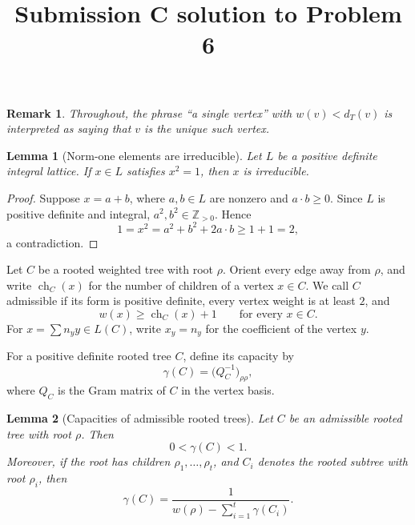 \documentclass[11pt]{article}
\newtheorem{lemma}{Lemma}
\newtheorem{remark}{Remark}
\DeclareMathOperator{\ch}{ch}
\begin{document}
\title{Submission C solution to Problem 6}
\date{}
\maketitle


\begin{remark}
Throughout, the phrase ``a single vertex'' with \(w(v)<d_T(v)\) is interpreted as saying that \(v\) is the unique such vertex.
\end{remark}

\begin{lemma}[Norm-one elements are irreducible]
Let \(L\) be a positive definite integral lattice. If \(x\in L\) satisfies \(x^2=1\), then \(x\) is irreducible.
\end{lemma}

\begin{proof}
Suppose \(x=a+b\), where \(a,b\in L\) are nonzero and \(a\cdot b\ge 0\). Since \(L\) is positive definite and integral, \(a^2,b^2\in \mathbb Z_{>0}\). Hence
\[
1=x^2=a^2+b^2+2a\cdot b\ge 1+1=2,
\]
a contradiction.
\end{proof}

Let \(C\) be a rooted weighted tree with root \(\rho\). Orient every edge away from \(\rho\), and write \(\ch_C(x)\) for the number of children of a vertex \(x\in C\). We call \(C\) admissible if its form is positive definite, every vertex weight is at least \(2\), and
\[
w(x)\ge \ch_C(x)+1
\qquad \text{for every } x\in C.
\]
For \(x=\sum n_y y\in L(C)\), write \(x_y=n_y\) for the coefficient of the vertex \(y\).

For a positive definite rooted tree \(C\), define its capacity by
\[
\gamma(C)=\bigl(Q_C^{-1}\bigr)_{\rho\rho},
\]
where \(Q_C\) is the Gram matrix of \(C\) in the vertex basis.

\begin{lemma}[Capacities of admissible rooted trees]
Let \(C\) be an admissible rooted tree with root \(\rho\). Then
\[
0<\gamma(C)<1.
\]
Moreover, if the root has children \(\rho_1,\dots,\rho_t\), and \(C_i\) denotes the rooted subtree with root \(\rho_i\), then
\[
\gamma(C)=\frac{1}{w(\rho)-\sum_{i=1}^t \gamma(C_i)}.
\]
\end{lemma}
\end{document}
